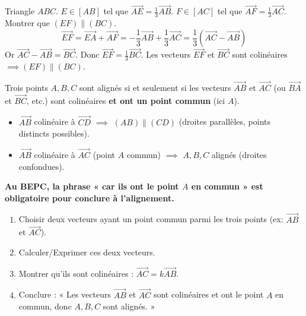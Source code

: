 \documentclass[11pt]{article}
\newcommand{\cle}[1]{{\popxbold\color{popdark}#1}}
\begin{document}
\begin{exoresolu}
Triangle $ABC$. $E \in [AB]$ tel que $\overrightarrow{AE} = \frac{1}{3}\overrightarrow{AB}$. $F \in [AC]$ tel que $\overrightarrow{AF} = \frac{1}{3}\overrightarrow{AC}$.
Montrer que $(EF) \parallel (BC)$.
\tcblower
\[ \overrightarrow{EF} = \overrightarrow{EA} + \overrightarrow{AF} = -\frac{1}{3}\overrightarrow{AB} + \frac{1}{3}\overrightarrow{AC} = \frac{1}{3}(\overrightarrow{AC} - \overrightarrow{AB}) \]
Or $\overrightarrow{AC} - \overrightarrow{AB} = \overrightarrow{BC}$.
Donc $\overrightarrow{EF} = \frac{1}{3}\overrightarrow{BC}$.
Les vecteurs $\overrightarrow{EF}$ et $\overrightarrow{BC}$ sont colinéaires $\implies (EF) \parallel (BC)$.
\end{exoresolu}

\begin{propriete}
Trois points $A, B, C$ sont \cle{alignés} si et seulement si les vecteurs $\overrightarrow{AB}$ et $\overrightarrow{AC}$ (ou $\overrightarrow{BA}$ et $\overrightarrow{BC}$, etc.) sont colinéaires \textbf{et ont un point commun} (ici $A$).
\end{propriete}

\begin{attention}
\begin{itemize}
\item $\overrightarrow{AB}$ colinéaire à $\overrightarrow{CD}$ $\implies$ $(AB) \parallel (CD)$ (droites parallèles, points distincts possibles).
\item $\overrightarrow{AB}$ colinéaire à $\overrightarrow{AC}$ (point $A$ commun) $\implies$ $A, B, C$ alignés (droites confondues).
\end{itemize}
\textbf{Au BEPC, la phrase « car ils ont le point $A$ en commun » est obligatoire pour conclure à l'alignement.}
\end{attention}

\begin{methode}
\begin{enumerate}
\item Choisir deux vecteurs ayant un point commun parmi les trois points (ex: $\overrightarrow{AB}$ et $\overrightarrow{AC}$).
\item Calculer/Exprimer ces deux vecteurs.
\item Montrer qu'ils sont colinéaires : $\overrightarrow{AC} = k\overrightarrow{AB}$.
\item Conclure : « Les vecteurs $\overrightarrow{AB}$ et $\overrightarrow{AC}$ sont colinéaires et ont le point $A$ en commun, donc $A, B, C$ sont alignés. »
\end{enumerate}
\end{methode}
\end{document}
